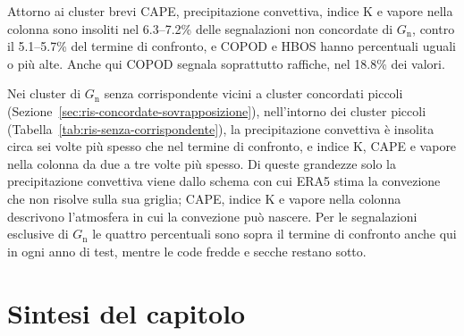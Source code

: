 
Attorno ai cluster brevi CAPE, precipitazione convettiva, indice K e vapore nella colonna sono insoliti nel 6.3--7.2\% delle segnalazioni non concordate di $G_{\mathrm{n}}$, contro il 5.1--5.7\% del termine di confronto, e COPOD e HBOS hanno percentuali uguali o più alte. Anche qui COPOD segnala soprattutto raffiche, nel 18.8\% dei valori.

Nei cluster di $G_{\mathrm{n}}$ senza corrispondente vicini a cluster concordati piccoli (Sezione~\ref{sec:ris-concordate-sovrapposizione}), nell'intorno dei cluster piccoli (Tabella~\ref{tab:ris-senza-corrispondente}), la precipitazione convettiva è insolita circa sei volte più spesso che nel termine di confronto, e indice K, CAPE e vapore nella colonna da due a tre volte più spesso. Di queste grandezze solo la precipitazione convettiva viene dallo schema con cui ERA5 stima la convezione che non risolve sulla sua griglia; CAPE, indice K e vapore nella colonna descrivono l'atmosfera in cui la convezione può nascere. Per le segnalazioni esclusive di $G_{\mathrm{n}}$ le quattro percentuali sono sopra il termine di confronto anche qui in ogni anno di test, mentre le code fredde e secche restano sotto.

\section{Sintesi del capitolo}
\label{sec:ris-sintesi}

